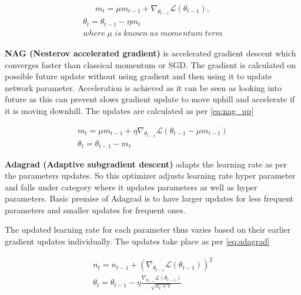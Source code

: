 \begin{equation}\label{eq:momentum}
\begin{aligned}
m_t = \mu m_{t-1}+\nabla_{\theta_{t-1}}\mathcal{L}(\theta_{t-1}),
\end{aligned}
\end{equation} 
\begin{equation}\label{eq:moment_up}
\begin{aligned}
\theta_t=\theta_{t-1} - \eta m_t\\
{\scriptstyle where \; \mu \; is \; known \; as \; momentum \; term}
\end{aligned}
\end{equation}

\noindent \textbf{NAG (Nesterov accelerated gradient)} is accelerated gradient descent which converges faster than classical momentum or SGD. The gradient is calculated on possible future update without using gradient and then using it to update network parameter. Acceleration is achieved as it can be seen as looking into future as this can prevent slows gradient update to move uphill and accelerate if it is moving downhill. The updates are calculated as per \ref{eq:nag_up}


\begin{equation}\label{eq:nag_up}
\begin{aligned}
m_t = \mu m_{t-1}+\eta\nabla_{\theta_{t-1}}\mathcal{L}(\theta_{t-1}-\mu m_{t-1}) \\
\theta_t=\theta_{t-1} - m_t
\end{aligned}
\end{equation} 

\noindent\textbf{Adagrad (Adaptive subgradient descent)} \cite{Duchi:2011:ASM:1953048.2021068} adapts the learning rate as per the parameters updates. So this optimizer adjusts learning rate hyper parameter and falls under category where it updates parameters as well as hyper parameters. Basic premise of Adagrad is to have larger updates for less frequent parameters and smaller updates for frequent ones.

\noindent The updated learning rate for each parameter thus varies based on their earlier gradient updates individually. The updates take place as per \ref{eq:adagrad}

\begin{equation}\label{eq:adagrad}
\begin{aligned}
n_t=n_{t-1}+(\nabla_{\theta_{t-1}}\mathcal{L}(\theta_{t-1}))^2\\
\theta_t=\theta_{t-1} - \eta \frac{\nabla_{\theta_{t-1}}\mathcal{L}(\theta_{t-1})}{\sqrt{n_t+\epsilon}}
\end{aligned}
\end{equation}

